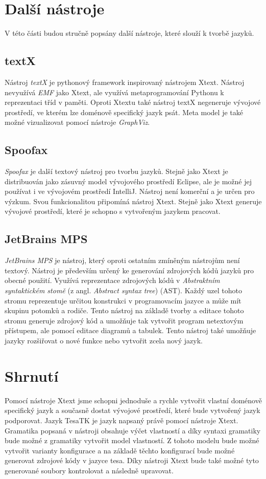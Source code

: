 \section{Další nástroje}
V této části budou stručně popsány další nástroje, které slouží k tvorbě jazyků.

\subsection{textX}
Nástroj \textit{textX} je pythonový framework inspirovaný nástrojem Xtext. Nástroj nevyužívá \textit{EMF} jako Xtext, ale využívá metaprogramování Pythonu k reprezentaci tříd v paměti. Oproti Xtextu také nástroj textX negeneruje vývojové prostředí, ve kterém lze doménově specifický jazyk psát. Meta model je také možné vizualizovat pomocí nástroje \textit{GraphViz}. 

\subsection{Spoofax}
\textit{Spoofax} je další textový nástroj pro tvorbu jazyků. Stejně jako Xtext je distribuován jako zásuvný model vývojového prostředí Eclipse, ale je možné jej používat i ve vývojovém prostředí IntelliJ. Nástroj není komerční a je určen pro výzkum. Svou funkcionalitou připomíná nástroj Xtext. Stejně jako Xtext generuje vývojové prostředí, které je schopno s vytvořeným jazykem pracovat. 

\subsection{JetBrains MPS}
\textit{JetBrains MPS} je nástroj, který oproti ostatním zmíněným nástrojům není textový. Nástroj je především určený ke generování zdrojových kódů jazyků pro obecné použití. Využívá reprezentace zdrojových kódů v \textit{Abstraktním syntaktickém stomě} (z angl. \textit{Abstract syntax tree}) (AST). Každý uzel tohoto stromu reprezentuje určitou konstrukci v programovacím jazyce a může mít skupinu potomků a rodiče. Tento nástroj na základě tvorby a editace tohoto stromu generuje zdrojový kód a umožňuje tak vytvořit program netextovým přístupem, ale pomocí editace diagramů a tabulek. Tento nástroj také umožňuje jazyky rozšiřovat o nové funkce nebo vytvořit zcela nový jazyk.

\section{Shrnutí}
Pomocí nástroje Xtext jsme schopni jednoduše a rychle vytvořit vlastní doménově specifický jazyk a současně dostat vývojové prostředí, které bude vytvořený jazyk podporovat. Jazyk TesaTK je jazyk napsaný právě pomocí nástroje Xtext. Gramatika popsaná v nástroji obsahuje výčet vlastností a díky syntaxi gramatiky bude možné z gramatiky vytvořit model vlastností. Z tohoto modelu bude možné vytvořit varianty konfigurace a na základě těchto konfigurací bude možné generovat zdrojové kódy v jazyce tesa. Díky nástroji Xtext bude také možné tyto generované soubory kontrolovat a následně upravovat.




